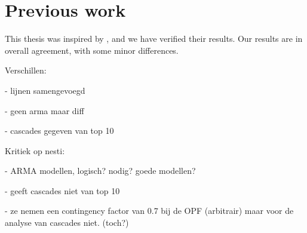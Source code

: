 \documentclass[main.tex]{subfiles}
\begin{document}
\section{Previous work}
This thesis was inspired by \cite{Nesti2018emergentfailures}, and we have verified their results. Our results are in overall agreement, with some minor differences. 

Verschillen:

- lijnen samengevoegd

- geen arma maar diff

- cascades gegeven van top 10


Kritiek op nesti:

- ARMA modellen, logisch? nodig? goede modellen?

- geeft cascades niet van top 10

- ze nemen een contingency factor van 0.7 bij de OPF (arbitrair) maar voor de analyse van cascades niet. (toch?)




\clearpage
\end{document}
